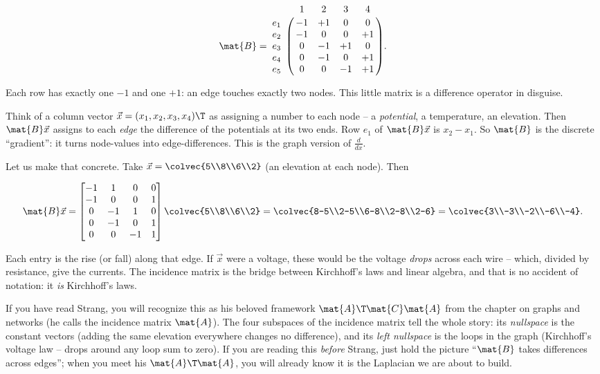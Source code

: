 \[
\mat{B} =
\bordermatrix{%
      & 1 & 2 & 3 & 4 \cr
e_1\; & -1 & +1 & 0 & 0 \cr
e_2\; & -1 & 0 & 0 & +1 \cr
e_3\; & 0 & -1 & +1 & 0 \cr
e_4\; & 0 & -1 & 0 & +1 \cr
e_5\; & 0 & 0 & -1 & +1 \cr}.
\]

Each row has exactly one $-1$ and one $+1$: an edge touches exactly two nodes. This little
matrix is a difference operator in disguise.

\begin{intuitionbox}
Think of a column vector $\vec{x} = (x_1,x_2,x_3,x_4)\T$ as assigning a number to each
node -- a \emph{potential}, a temperature, an elevation. Then $\mat{B}\vec{x}$ assigns to
each \emph{edge} the difference of the potentials at its two ends. Row $e_1$ of
$\mat{B}\vec{x}$ is $x_2 - x_1$. So $\mat{B}$ is the discrete ``gradient'': it turns
node-values into edge-differences. This is the graph version of $\frac{d}{dx}$.
\end{intuitionbox}

Let us make that concrete. Take $\vec{x} = \colvec{5\\8\\6\\2}$ (an elevation at each node).
Then

\[
\mat{B}\vec{x} =
\begin{bmatrix}
-1&1&0&0\\-1&0&0&1\\0&-1&1&0\\0&-1&0&1\\0&0&-1&1
\end{bmatrix}
\colvec{5\\8\\6\\2}
=
\colvec{8-5\\2-5\\6-8\\2-8\\2-6}
=
\colvec{3\\-3\\-2\\-6\\-4}.
\]

Each entry is the rise (or fall) along that edge. If $\vec{x}$ were a voltage, these would
be the voltage \emph{drops} across each wire -- which, divided by resistance, give the
currents. The incidence matrix is the bridge between Kirchhoff's laws and linear algebra,
and that is no accident of notation: it \emph{is} Kirchhoff's laws.

\begin{strangbox}
If you have read Strang, you will recognize this as his beloved framework
$\mat{A}\T \mat{C} \mat{A}$ from the chapter on graphs and networks (he calls the incidence
matrix $\mat{A}$). The four subspaces of the incidence matrix tell the whole story: its
\emph{nullspace} is the constant vectors (adding the same elevation everywhere changes no
difference), and its \emph{left nullspace} is the loops in the graph (Kirchhoff's voltage
law -- drops around any loop sum to zero). If you are reading this \emph{before} Strang,
just hold the picture ``$\mat{B}$ takes differences across edges''; when you meet his
$\mat{A}\T \mat{A}$, you will already know it is the Laplacian we are about to build.
\end{strangbox}

